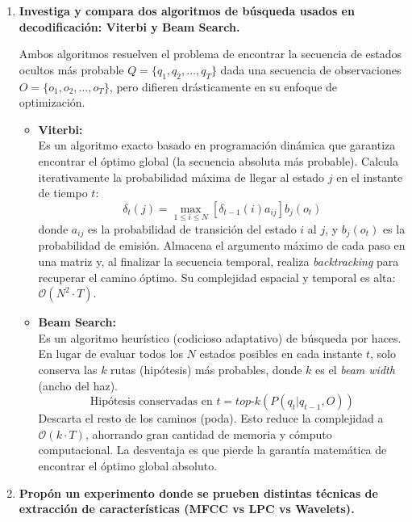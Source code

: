 \documentclass[12pt]{article}
\begin{document}
\begin{itemize}
\begin{itemize}
			
		\end{itemize}	
		
		
		\begin{enumerate}
			\item \textbf{Investiga y compara dos algoritmos de búsqueda usados en decodificación: Viterbi y Beam Search.}
			
			Ambos algoritmos resuelven el problema de encontrar la secuencia de estados ocultos más probable $Q = \{q_1, q_2, \dots, q_T\}$ dada una secuencia de observaciones $O = \{o_1, o_2, \dots, o_T\}$, pero difieren drásticamente en su enfoque de optimización.
			
			\begin{itemize}
				\item \textbf{Viterbi:} \\
				Es un algoritmo exacto basado en programación dinámica que garantiza encontrar el óptimo global (la secuencia absoluta más probable). Calcula iterativamente la probabilidad máxima de llegar al estado $j$ en el instante de tiempo $t$:
				\begin{equation}
					\delta_t(j) = \max_{1 \le i \le N} [\delta_{t-1}(i) a_{ij}] b_j(o_t)
				\end{equation}
				donde $a_{ij}$ es la probabilidad de transición del estado $i$ al $j$, y $b_j(o_t)$ es la probabilidad de emisión. Almacena el argumento máximo de cada paso en una matriz y, al finalizar la secuencia temporal, realiza \textit{backtracking} para recuperar el camino óptimo. Su complejidad espacial y temporal es alta: $\mathcal{O}(N^2 \cdot T)$.
				
				\item \textbf{Beam Search:} \\
				Es un algoritmo heurístico (codicioso adaptativo) de búsqueda por haces. En lugar de evaluar todos los $N$ estados posibles en cada instante $t$, solo conserva las $k$ rutas (hipótesis) más probables, donde $k$ es el \textit{beam width} (ancho del haz). 
				\begin{equation}
					\text{Hipótesis conservadas en } t = top\text{-}k \left( P(q_t | q_{t-1}, O) \right)
				\end{equation}
				Descarta el resto de los caminos (poda). Esto reduce la complejidad a $\mathcal{O}(k \cdot T)$, ahorrando gran cantidad de memoria y cómputo computacional. La desventaja es que pierde la garantía matemática de encontrar el óptimo global absoluto.
			\end{itemize}
			
			\vspace{0.5cm}
			\item \textbf{Propón un experimento donde se prueben distintas técnicas de extracción de características (MFCC vs LPC vs Wavelets).}
			

\end{enumerate}
\end{itemize}
\end{document}

